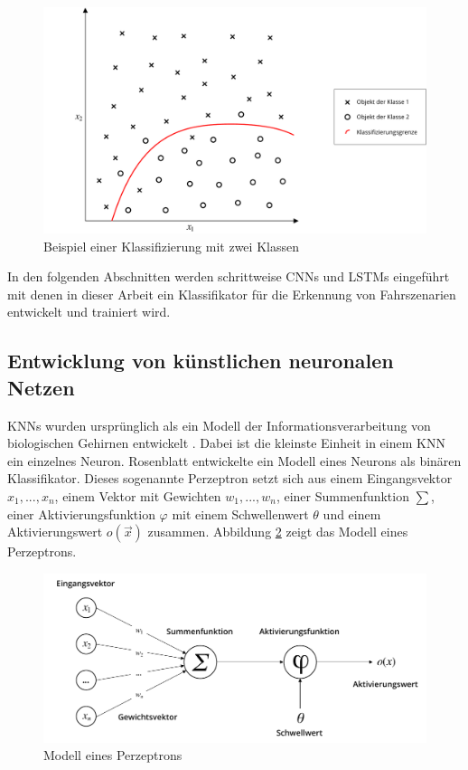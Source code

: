 \begin{figure}[h]
\centering
\includegraphics[scale=0.5]{images/klassifizierung.pdf}
\caption{Beispiel einer Klassifizierung mit zwei Klassen}
\label{fig_klassifizierung}
\end{figure}

In den folgenden Abschnitten werden schrittweise \acp{CNN} und \acp{LSTM} eingeführt mit denen in dieser Arbeit ein Klassifikator für die Erkennung von Fahrszenarien entwickelt und trainiert wird.


\subsection{Entwicklung von künstlichen neuronalen Netzen}
\label{grundlagen_nn_entwicklung}

\acp{KNN} wurden ursprünglich als ein Modell der Informationsverarbeitung von biologischen Gehirnen entwickelt \cite{mcculloch1943logical}. Dabei ist die kleinste Einheit in einem \ac{KNN} ein einzelnes Neuron. Rosenblatt \cite{rosenblatt1958perceptron} entwickelte ein Modell eines Neurons als binären Klassifikator. Dieses sogenannte Perzeptron setzt sich aus einem Eingangsvektor $x_1, ..., x_n$, einem Vektor mit Gewichten $w_1, ..., w_n$, einer Summenfunktion $\sum$, einer Aktivierungsfunktion $\varphi$ mit einem Schwellenwert $\theta$ und einem Aktivierungswert $o(\vec{x})$ zusammen. Abbildung \ref{fig_perceptron} zeigt das Modell eines Perzeptrons.

\begin{figure}[h]
\centering
\includegraphics[scale=0.7]{images/perceptron.pdf}
\caption{Modell eines Perzeptrons \cite{rosenblatt1958perceptron}}
\label{fig_perceptron}
\end{figure}

